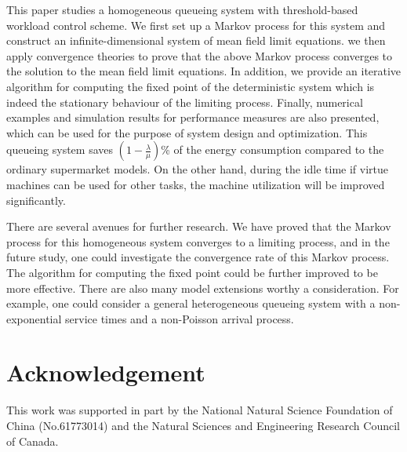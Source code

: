 \documentclass[12pt]{article}
\begin{document}
This paper studies a homogeneous queueing system with threshold-based workload control scheme. We first set up a Markov process for this system and construct an infinite-dimensional system of mean field limit equations. we then apply convergence theories to prove that the above Markov process converges to the solution to the mean field limit equations. In addition, we provide an iterative algorithm for computing the fixed point of the deterministic system which is indeed the stationary behaviour of the limiting process. Finally, numerical examples and simulation results for performance measures are also presented, which can be used for the purpose of system design and optimization. This queueing system saves $(1-\frac{\lambda}{\mu})$\% of the energy consumption compared to the ordinary supermarket models. On the other hand, during the idle time if virtue machines can be  used for other tasks, the machine utilization will be improved significantly.

There are several avenues for further research. We have proved that the Markov process for this homogeneous system converges to a limiting process, and in the future study, one could investigate the convergence rate of this Markov process. The algorithm for computing the fixed point could be further improved to be more effective. There are also many model extensions worthy a consideration. For example, one could consider a general heterogeneous queueing system with a non-exponential service times and a non-Poisson arrival process.

\section*{Acknowledgement}
This work was supported in part by the National Natural Science Foundation of China (No.61773014) and the Natural Sciences and Engineering Research Council of Canada.
\end{document}
